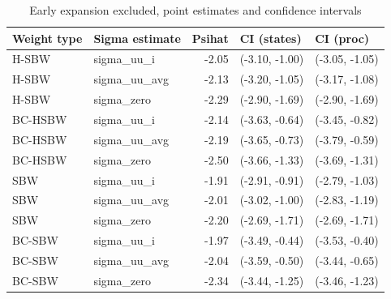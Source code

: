 \begin{table}[ht]
\centering
\caption{Early expansion excluded, point estimates and confidence intervals}
\label{tab:confintmainc2}
\begin{tabular}{llrll}
  \hline
Weight type & Sigma estimate & Psihat & CI (states) & CI (proc) \\ 
  \hline
H-SBW & sigma\_uu\_i & -2.05 & (-3.10, -1.00) & (-3.05, -1.05) \\ 
  H-SBW & sigma\_uu\_avg & -2.13 & (-3.20, -1.05) & (-3.17, -1.08) \\ 
  H-SBW & sigma\_zero & -2.29 & (-2.90, -1.69) & (-2.90, -1.69) \\ 
  BC-HSBW & sigma\_uu\_i & -2.14 & (-3.63, -0.64) & (-3.45, -0.82) \\ 
  BC-HSBW & sigma\_uu\_avg & -2.19 & (-3.65, -0.73) & (-3.79, -0.59) \\ 
  BC-HSBW & sigma\_zero & -2.50 & (-3.66, -1.33) & (-3.69, -1.31) \\ 
  SBW & sigma\_uu\_i & -1.91 & (-2.91, -0.91) & (-2.79, -1.03) \\ 
  SBW & sigma\_uu\_avg & -2.01 & (-3.02, -1.00) & (-2.83, -1.19) \\ 
  SBW & sigma\_zero & -2.20 & (-2.69, -1.71) & (-2.69, -1.71) \\ 
  BC-SBW & sigma\_uu\_i & -1.97 & (-3.49, -0.44) & (-3.53, -0.40) \\ 
  BC-SBW & sigma\_uu\_avg & -2.04 & (-3.59, -0.50) & (-3.44, -0.65) \\ 
  BC-SBW & sigma\_zero & -2.34 & (-3.44, -1.25) & (-3.46, -1.23) \\ 
   \hline
\end{tabular}
\end{table}

